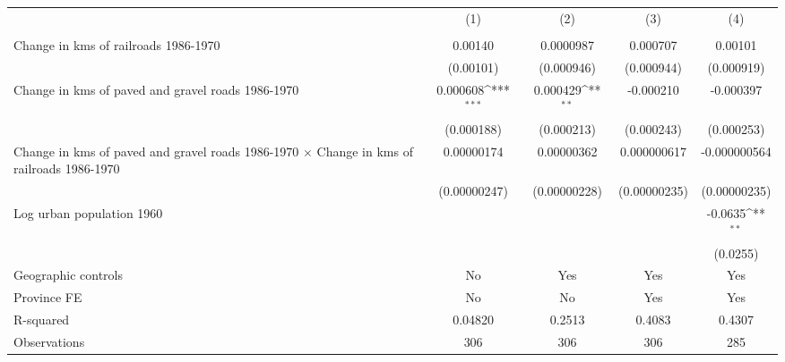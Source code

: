 {
\def\sym#1{\ifmmode^{#1}\else\(^{#1}\)\fi}
\begin{tabular}{l*{4}{c}}
\hline\hline
                &\multicolumn{1}{c}{(1)}&\multicolumn{1}{c}{(2)}&\multicolumn{1}{c}{(3)}&\multicolumn{1}{c}{(4)}\\
                &\multicolumn{1}{c}{}&\multicolumn{1}{c}{}&\multicolumn{1}{c}{}&\multicolumn{1}{c}{}\\
\hline
Change in kms of railroads 1986-1970&  0.00140         &0.0000987         & 0.000707         &  0.00101         \\
                &(0.00101)         &(0.000946)         &(0.000944)         &(0.000919)         \\
[1em]
Change in kms of paved and gravel roads 1986-1970& 0.000608\sym{***}& 0.000429\sym{**} &-0.000210         &-0.000397         \\
                &(0.000188)         &(0.000213)         &(0.000243)         &(0.000253)         \\
[1em]
Change in kms of paved and gravel roads 1986-1970 $\times$ Change in kms of railroads 1986-1970&0.00000174         &0.00000362         &0.000000617         &-0.000000564         \\
                &(0.00000247)         &(0.00000228)         &(0.00000235)         &(0.00000235)         \\
[1em]
Log urban population 1960&                  &                  &                  &  -0.0635\sym{**} \\
                &                  &                  &                  & (0.0255)         \\
\hline
Geographic controls&       No         &      Yes         &      Yes         &      Yes         \\
Province FE     &       No         &       No         &      Yes         &      Yes         \\
R-squared       &  0.04820         &   0.2513         &   0.4083         &   0.4307         \\
Observations    &      306         &      306         &      306         &      285         \\
\hline\hline
\end{tabular}
}
